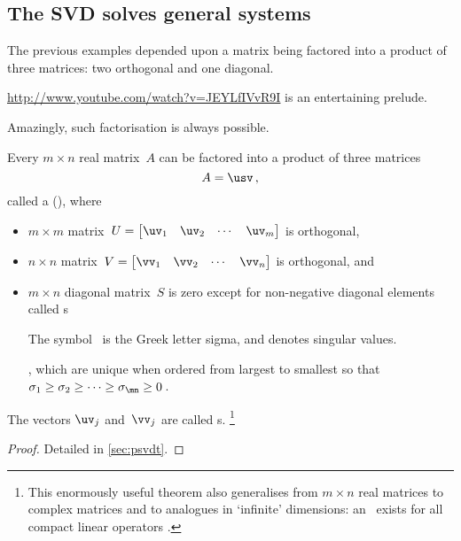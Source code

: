 \subsection{The SVD solves general systems}
\label{sec:svdsgs}

The previous examples depended upon a matrix being factored into a product of three matrices: two orthogonal and one diagonal.
\begin{aside}\url{http://www.youtube.com/watch?v=JEYLfIVvR9I} is an entertaining prelude.\end{aside}%
Amazingly, such factorisation is always possible.

\begin{theorem} \label{thm:svd} 
    Every $m\times n$ real matrix~$A$ can be factored into a product of three matrices
    \begin{equation}
        A=\usv\,,
    \end{equation}
    called a  (\svd), where
    \begin{itemize}
		\item $m\times m$ matrix~$U=\begin{bmatrix} \uv _1 &\uv_2&\cdots&\uv _m \end{bmatrix}$ is orthogonal, 
		\item $n\times n$ matrix~$V=\begin{bmatrix} \vv_1 &\vv_2&\cdots&\vv_n \end{bmatrix}$ is orthogonal, and      
        \item  $m\times n$ diagonal matrix~$S$ is zero except for non-negative diagonal elements called s
\begin{aside}
The symbol~\idx{$\sigma$} is the Greek letter sigma, and denotes singular values.
\end{aside}%
\hlist\sigma\mn, which are unique when ordered from largest to smallest so that $\sigma_1\geq \sigma_2 \geq \cdots \geq \sigma_{\mn}\geq 0$\,.
    \end{itemize}
    The  vectors \(\uv_j\) and~\(\vv_j\) are called s.
    \footnote{This enormously useful theorem also generalises from \(m\times n\) real matrices to complex matrices and to analogues in `infinite' dimensions: an \svd\ exists for all compact linear operators \cite[\S7]{Kress2015}.}
\end{theorem}

\begin{proof}
Detailed in \autoref{sec:psvdt}.
\end{proof}

